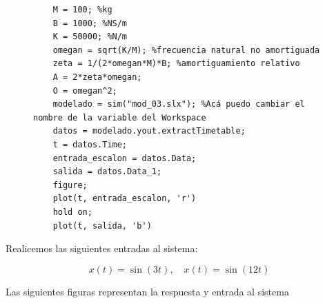 \documentclass[twoside]{article}
\begin{document}
\begin{figure}[ht!]
    \begin{lstlisting}[caption={Respuesta y ploteo del sistema de amortiguamiento}, label={lst_codigo1}]
    %Código para un sistema de amortiguamiento con entrada escalón
    M = 100; %kg
    B = 1000; %NS/m
    K = 50000; %N/m
    omegan = sqrt(K/M); %frecuencia natural no amortiguada
    zeta = 1/(2*omegan*M)*B; %amortiguamiento relativo 
    A = 2*zeta*omegan;
    O = omegan^2;
    modelado = sim("mod_03.slx"); %Acá puedo cambiar el nombre de la variable del Workspace
    datos = modelado.yout.extractTimetable;
    t = datos.Time;
    entrada_escalon = datos.Data;
    salida = datos.Data_1;
    figure;
    plot(t, entrada_escalon, 'r')
    hold on;
    plot(t, salida, 'b')
    \end{lstlisting}
\end{figure}



\begin{figure}[ht!]
    \centering
    \caption{}
    \label{fig:3}
\end{figure}

Realicemos las siguientes entradas al sistema:

\begin{equation}
    x(t) = \sin(3t), \quad x(t) = \sin(12t)
\end{equation}

\noindent Las siguientes figuras representan la respuesta y entrada al sistema
\end{document}
